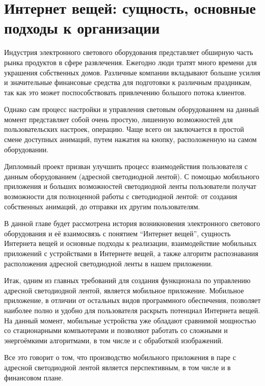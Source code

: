 \section{Интернет вещей: сущность, основные подходы к организации}
\label{sec:subject}

Индустрия электронного светового оборудования представляет обширную часть рынка продуктов в сфере развлечения. Ежегодно люди тратят много времени для украшения собственных домов. Различные компании вкладывают большие усилия и значительные финансовые средства для подготовки к различным праздникам, так как это может поспособствовать привлечению большого потока клиентов.

Однако сам процесс настройки и управления световым оборудованием на данный момент представляет собой очень простую, лишенную возможностей для пользовательских настроек, операцию. Чаще всего он заключается в простой смене доступных анимаций, путем нажатия на кнопку, расположенную на самом оборудовании.

Дипломный проект призван улучшить процесс взаимодействия пользователя с данным оборудованием (адресной светодиодной лентой). С помощью мобильного приложения и больших возможностей светодиодной ленты пользователи получат возможности для полноценной работы с светодиодной лентой: от создания собственных анимаций, до отправки их другим пользователям.

В данной главе будет рассмотрена история возникновения электронного светового оборудования и её взаимосвязь с понятием \enquote{Интернет вещей}, сущность Интернета вещей и основные подходы к реализации, взаимодействие мобильных приложений с устройствами в Интернете вещей, а также алгоритм распознавания расположения адресной светодиодной ленты в нашем приложении.











Итак, одним из главных требований для создания функционала по управлению адресной светодиодной лентой, является мобильное приложение. Мобильное приложение, в отличии от остальных видов программного обеспечения, позволяет наиболее полно и удобно для пользователя раскрыть потенциал Интернета вещей. На данный момент, мобильные устройства уже обладают сравнимой мощностью со стационарными компьютерами и позволяют работать со сложными и энергоёмкими алгоритмами, в том числе и с обработкой изображений.

Все это говорит о том, что производство мобильного приложения в паре с адресной светодиодной лентой является перспективным, в том числе и в финансовом плане.